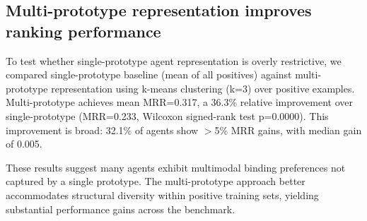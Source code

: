 \subsection{Multi-prototype representation improves ranking performance}

To test whether single-prototype agent representation is overly restrictive, we compared single-prototype baseline (mean of all positives) against multi-prototype representation using k-means clustering (k=3) over positive examples. Multi-prototype achieves mean MRR=0.317, a 36.3\% relative improvement over single-prototype (MRR=0.233, Wilcoxon signed-rank test p=0.0000). This improvement is broad: 32.1\% of agents show $>$5\% MRR gains, with median gain of 0.005. 

These results suggest many agents exhibit multimodal binding preferences not captured by a single prototype. The multi-prototype approach better accommodates structural diversity within positive training sets, yielding substantial performance gains across the benchmark.